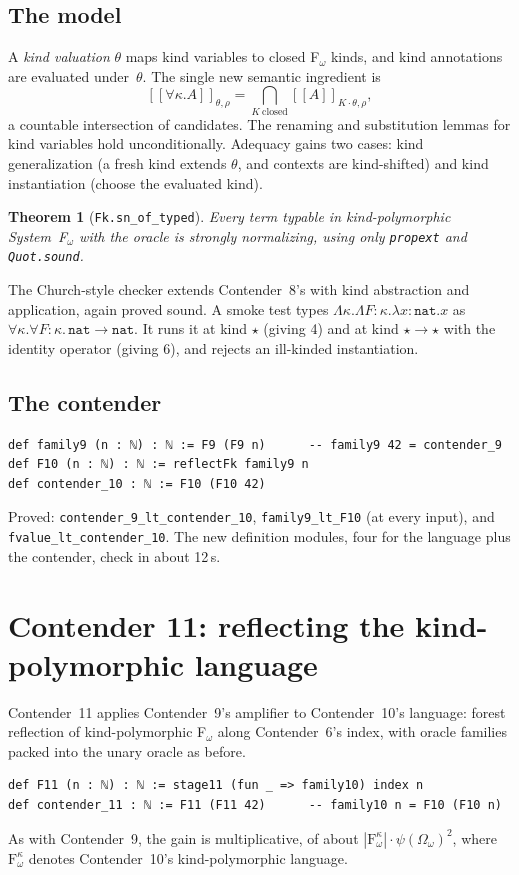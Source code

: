 \documentclass[11pt]{article}
\newtheorem{theorem}{Theorem}
\theoremstyle{definition}
\theoremstyle{remark}
\providecommand{\llbracket}{[\![}
\providecommand{\rrbracket}{]\!]}
\newcommand{\lean}[1]{\texttt{#1}}
\begin{document}
\subsection{The model}
A \emph{kind valuation} $\theta$ maps kind variables to closed F$_\omega$ kinds,
and kind annotations are evaluated under~$\theta$. The single new semantic
ingredient is
\[\llbracket\forall\kappa.A\rrbracket_{\theta,\rho} = \bigcap_{K\ \text{closed}}\llbracket A\rrbracket_{K\cdot\theta,\rho},\]
a countable intersection of candidates. The renaming and substitution lemmas
for kind variables hold unconditionally. Adequacy gains two cases: kind
generalization (a fresh kind extends $\theta$, and contexts are kind-shifted)
and kind instantiation (choose the evaluated kind).
\begin{theorem}[\lean{Fk.sn\_of\_typed}]
Every term typable in kind-polymorphic System~F$_\omega$ with the oracle is
strongly normalizing, using only \lean{propext} and \lean{Quot.sound}.
\end{theorem}
The Church-style checker extends Contender~8's with kind abstraction and
application, again proved sound. A smoke test types
$\Lambda\kappa.\Lambda F{:}\kappa.\lambda x{:}\mathtt{nat}.x$ as
$\forall\kappa.\forall F{:}\kappa.\,\mathtt{nat}\to\mathtt{nat}$. It runs it at
kind $\star$ (giving 4) and at kind $\star\to\star$ with the identity operator
(giving 6), and rejects an ill-kinded instantiation.

\subsection{The contender}
\begin{lstlisting}
def family9 (n : ℕ) : ℕ := F9 (F9 n)      -- family9 42 = contender_9
def F10 (n : ℕ) : ℕ := reflectFk family9 n
def contender_10 : ℕ := F10 (F10 42)
\end{lstlisting}
Proved: \lean{contender\_9\_lt\_\allowbreak contender\_10}, \lean{family9\_lt\_F10} (at
every input), and \lean{fvalue\_lt\_\allowbreak contender\_10}. The new definition modules,
four for the language plus the contender, check in about 12\,s.

\section{Contender 11: reflecting the kind-polymorphic language}

Contender~11 applies Contender~9's amplifier to Contender~10's language:
forest reflection of kind-polymorphic F$_\omega$ along Contender~6's index,
with oracle families packed into the unary oracle as before.
\begin{lstlisting}
def F11 (n : ℕ) : ℕ := stage11 (fun _ => family10) index n
def contender_11 : ℕ := F11 (F11 42)      -- family10 n = F10 (F10 n)
\end{lstlisting}
As with Contender~9, the gain is multiplicative, of about
$|\mathrm{F}_\omega^{\kappa}|\cdot\psi(\Omega_\omega)^2$, where
$\mathrm{F}_\omega^{\kappa}$ denotes Contender~10's kind-polymorphic language.
\end{document}
